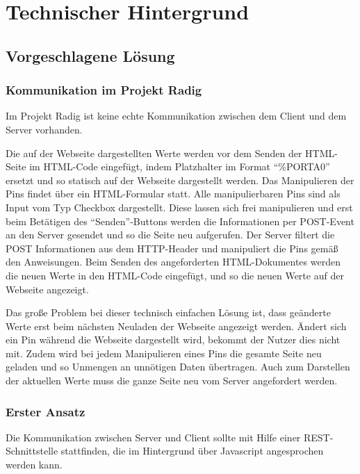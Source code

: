 
\chapter{Technischer Hintergrund}

\section{Vorgeschlagene Lösung}

\subsection{Kommunikation im Projekt Radig}
Im Projekt Radig ist keine echte Kommunikation zwischen dem Client und dem Server
vorhanden.

Die auf der Webseite dargestellten Werte werden vor dem Senden der HTML-Seite
im HTML-Code eingefügt, indem Platzhalter im Format "`\%PORTA0"' ersetzt und so statisch auf
der Webseite dargestellt werden. Das Manipulieren der Pins findet über ein HTML-Formular
statt. Alle manipulierbaren Pins sind als Input vom Typ Checkbox dargestellt. Diese lassen
sich frei manipulieren und erst beim Betätigen des "`Senden"'-Buttons werden die
Informationen per POST-Event an den Server gesendet und so die Seite neu aufgerufen. Der
Server filtert die POST Informationen aus dem HTTP-Header und manipuliert die Pins gemäß
den Anweisungen. Beim Senden des angeforderten HTML-Dokumentes werden die neuen Werte in
den HTML-Code eingefügt, und so die neuen Werte auf der Webseite angezeigt.

Das große Problem bei dieser technisch einfachen Lösung ist, dass geänderte Werte erst beim
nächsten Neuladen der Webseite angezeigt werden. Ändert sich ein Pin während die Webseite
dargestellt wird, bekommt der Nutzer dies nicht mit. Zudem wird bei jedem Manipulieren
eines Pins die gesamte Seite neu geladen und so Unmengen an unnötigen Daten übertragen.
Auch zum Darstellen der aktuellen Werte muss die ganze Seite neu vom Server angefordert
werden.

\subsection{Erster Ansatz}
Die Kommunikation zwischen Server und Client sollte mit Hilfe einer REST-Schnittstelle
stattfinden, die im Hintergrund über Javascript angesprochen werden kann.

